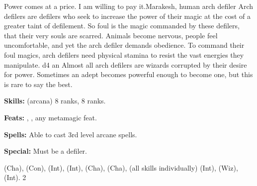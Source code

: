 {Power comes at a price. I am willing to pay it.}{Marakesh, human arch defiler}
{Arch defilers are defilers who seek to increase the power of their magic at the cost of a greater taint of defilement. So foul is the magic commanded by these defilers, that their very souls are scarred. Animals become nervous, people feel uncomfortable, and yet the arch defiler demands obedience. To command their foul magics, arch defilers need physical stamina to resist the vast energies they manipulate.}
{d4}
{an}
{Almost all arch defilers are wizards corrupted by their desire for power. Sometimes an adept becomes powerful enough to become one, but this is rare to say the best.}
{\textbf{Skills:}  (arcana) 8 ranks,  8 ranks.

\textbf{Feats:} , , any metamagic feat.

\textbf{Spells:} Able to cast 3rd level arcane spells.

\textbf{Special:} Must be a defiler.}
{ (Cha),  (Con),  (Int),  (Int),  (Cha),  (Cha),  (all skills individually) (Int),  (Wiz),  (Int).}
{2}
